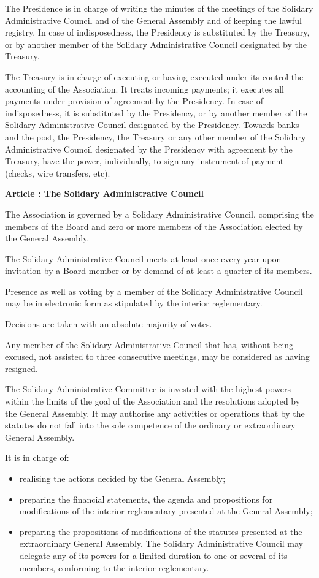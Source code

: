 \documentclass [11pt]{article}
\renewcommand {\section}[1]{\stepcounter {section}%
{\vspace {1em}\noindent\Large \bf Article \thesection: #1 \par}}
\begin{document}
The Presidence is in charge of writing the minutes of the meetings of the
Solidary Administrative Council and of the General Assembly and of keeping
the lawful registry. In case of indisposedness, the Presidency is substituted
by the Treasury, or by another member of the Solidary Administrative Council
designated by the Treasury.

The Treasury is in charge of executing or having executed under its control
the accounting of the Association. It treats incoming payments; it executes
all payments under provision of agreement by the Presidency. In case of
indisposedness, it is substituted by the Presidency, or by another member
of the Solidary Administrative Council designated by the Presidency.
Towards banks and the post, the Presidency, the Treasury or any other member
of the Solidary Administrative Council designated by the Presidency with
agreement by the Treasury, have the power, individually, to sign any
instrument of payment (checks, wire transfers, etc).


\section {The Solidary Administrative Council}

The Association is governed by a Solidary Administrative Council,
comprising the members of the Board and zero or more members of the
Association elected by the General Assembly.

The Solidary Administrative Council meets at least once every year
upon invitation by a Board member or by demand of at least a quarter
of its members.

Presence as well as voting by a member of the Solidary Administrative
Council may be in electronic form as stipulated by the interior reglementary.

Decisions are taken with an absolute majority of votes.

Any member of the Solidary Administrative Council that has, without being
excused, not assisted to three consecutive meetings, may be considered
as having resigned.

The Solidary Administrative Committee is invested with the highest powers
within the limits of the goal of the Association and the resolutions
adopted by the General Assembly. It may authorise any activities or
operations that by the statutes do not fall into the sole competence
of the ordinary or extraordinary General Assembly.

It is in charge of:
\begin {itemize}
\item
realising the actions decided by the General Assembly;
\item
preparing the financial statements, the agenda and propositions
for modifications of the interior reglementary presented at the
General Assembly;
\item
preparing the propositions of modifications of the statutes presented
at the extraordinary General Assembly. The Solidary Administrative Council
may delegate any of its powers for a limited duration to one or several
of its members, conforming to the interior reglementary.
\end {itemize}
\end{document}
